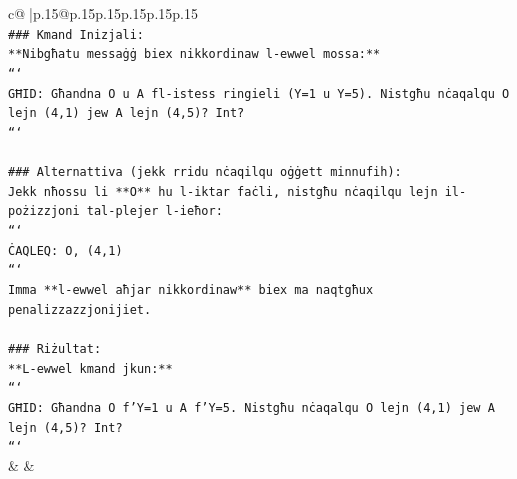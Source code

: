\documentclass{article}
\begin{document}
{\begin{supertabular}{c@{$\;$}|p{.15\linewidth}@{}p{.15\linewidth}p{.15\linewidth}p{.15\linewidth}p{.15\linewidth}p{.15\linewidth}}
{{{\\ 
\texttt{\#\#\# Kmand Inizjali:} \\
\texttt{**Nibgħatu messaġġ biex nikkordinaw l{-}ewwel mossa:**} \\
\texttt{```} \\
\texttt{GĦID: Għandna O u A fl{-}istess ringieli (Y=1 u Y=5). Nistgħu nċaqalqu O lejn (4,1) jew A lejn (4,5)? Int?} \\
\texttt{```} \\
\\ 
\texttt{\#\#\# Alternattiva (jekk rridu nċaqilqu oġġett minnufih):} \\
\texttt{Jekk nħossu li **O** hu l{-}iktar faċli, nistgħu nċaqilqu lejn il{-}pożizzjoni tal{-}plejer l{-}ieħor:} \\
\texttt{```} \\
\texttt{ĊAQLEQ: O, (4,1)} \\
\texttt{```} \\
\texttt{Imma **l{-}ewwel aħjar nikkordinaw** biex ma naqtgħux penalizzazzjonijiet.} \\
\\ 
\texttt{\#\#\# Riżultat:} \\
\texttt{**L{-}ewwel kmand jkun:**} \\
\texttt{```} \\
\texttt{GĦID: Għandna O f'Y=1 u A f'Y=5. Nistgħu nċaqalqu O lejn (4,1) jew A lejn (4,5)? Int?} \\
\texttt{```} \\
            }
        }
    }
    & & \\ \\


\end{supertabular}}
\end{document}
